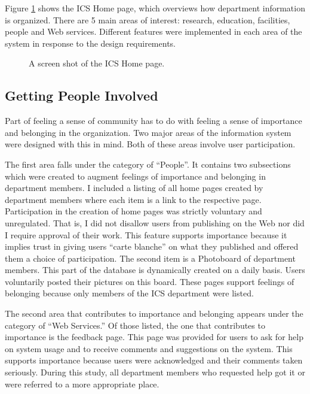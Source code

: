 Figure \ref{fig:UHPage} shows the ICS Home page, which overviews how department
information is organized.  There are 5 main areas of interest: research,
education, facilities, people and Web services.  Different features were
implemented in each area of the system in response to the design requirements.

\begin{figure}[htbp]
\centerline{}
\caption{A screen shot of the ICS Home page.}
\label{fig:UHPage}
\end{figure}

\subsection{Getting People Involved}
\label{sec:involved}
Part of feeling a sense of community has to do with feeling a sense of
importance and belonging in the organization.  Two major areas of the
information system were designed with this in mind.  Both of these areas
involve user participation.

The first area falls under the category of ``People''.  It contains two
subsections which were created to augment feelings of importance and belonging
in department members.  I included a listing of all home pages created by
department members where each item is a link to the respective page.
Participation in the creation of home pages was strictly voluntary and
unregulated.  That is, I did not disallow users from publishing on the Web nor
did I require approval of their work.  This feature supports importance because
it implies trust in giving users ``carte blanche'' on what they published and
offered them a choice of participation.  The second item is a Photoboard of
department members.  This part of the database is dynamically created on a
daily basis.  Users voluntarily posted their pictures on this board.  These
pages support feelings of belonging because only members of the ICS department
were listed.

The second area that contributes to importance and belonging appears under the
category of ``Web Services.''  Of those listed, the one that contributes to
importance is the feedback page.  This page was provided for users to ask for
help on system usage and to receive comments and suggestions on the system.
This supports importance because users were acknowledged and their comments
taken seriously.  During this study, all department members who requested help
got it or were referred to a more appropriate place.

